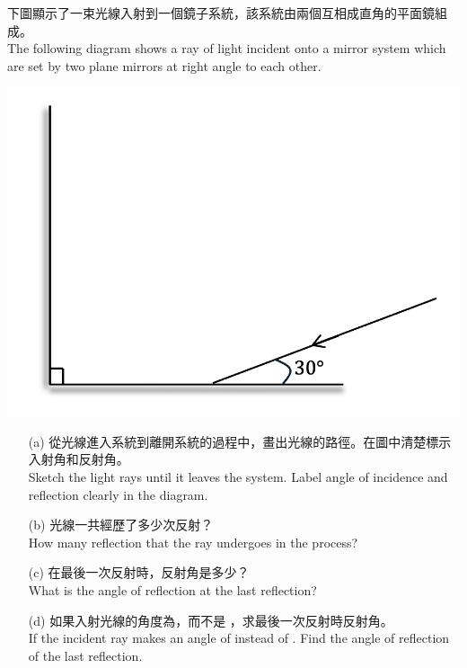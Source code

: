 \documentclass[beamer=true]{standalone}
\begin{document}
\begin{eg}
下圖顯示了一束光線入射到一個鏡子系統，該系統由兩個互相成直角的平面鏡組成。\\The following diagram shows a ray of light incident onto a mirror system which are set by two plane mirrors at right angle to each other.
{\par
    \centering
    \includegraphics[width=0.4\linewidth]{assets/diqwdowqjdiojwqimage.png} 
\par}
\begin{itemize}
    \item [(a)] 從光線進入系統到離開系統的過程中，畫出光線的路徑。在圖中清楚標示入射角和反射角。\\Sketch the light rays until it leaves the system. Label angle of incidence and reflection clearly in the diagram.
\end{itemize}      
\end{eg}
\begin{eg}
    \begin{itemize}
        \item [(b)] 光線一共經歷了多少次反射？\\How many reflection that the ray undergoes in the process?\vspace{1cm}
        \item [(c)] 在最後一次反射時，反射角是多少？\\What is the angle of reflection at the last reflection?
    \end{itemize}
\end{eg}
\begin{eg}
    \begin{itemize}
        \item [(d)] 如果入射光線的角度為，而不是 ，求最後一次反射時反射角。\\If the incident ray makes an angle of  instead of . Find the angle of reflection of the last reflection.
    \end{itemize}
\end{eg}
\end{document}
